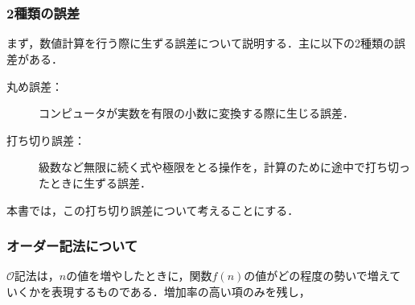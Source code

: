 \part{}


\section{2種類の誤差}
まず，数値計算を行う際に生ずる誤差について説明する．主に以下の2種類の誤差がある．
\begin{kotak}
	\begin{description}
   \item[丸め誤差：]コンピュータが実数を有限の小数に変換する際に生じる誤差．
   \item[打ち切り誤差：]級数など無限に続く式や極限をとる操作を，計算のために途中で打ち切ったときに生ずる誤差．
\end{description}
\end{kotak}
本書では，この打ち切り誤差について考えることにする．

\section{オーダー記法について}
$\mathcal{O}$記法は，$n$の値を増やしたときに，関数$f(n)$の値がどの程度の勢いで増えていくかを表現するものである．増加率の高い項のみを残し，
